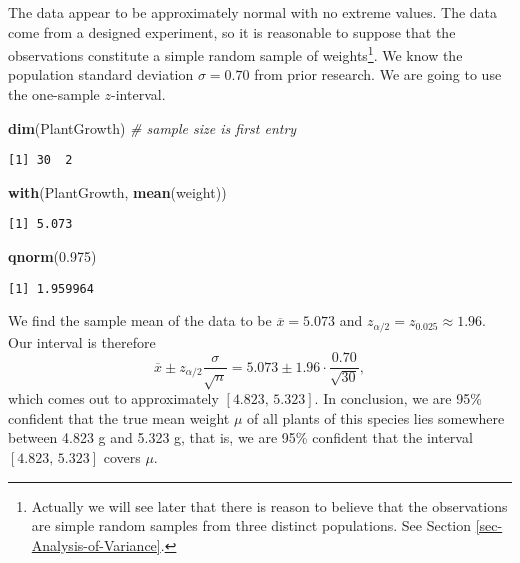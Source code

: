 \documentclass[]{book}
\newenvironment{Shaded}{\begin{snugshade}}{\end{snugshade}}
\newcommand{\KeywordTok}[1]{\textcolor[rgb]{0.13,0.29,0.53}{\textbf{{#1}}}}
\newcommand{\FloatTok}[1]{\textcolor[rgb]{0.00,0.00,0.81}{{#1}}}
\newcommand{\CommentTok}[1]{\textcolor[rgb]{0.56,0.35,0.01}{\textit{{#1}}}}
\newcommand{\NormalTok}[1]{{#1}}
\let\rmarkdownfootnote\footnote%
\def\footnote{\protect\rmarkdownfootnote}
\numberwithin{equation}{chapter}
\numberwithin{figure}{chapter}
\theoremstyle{plain}
\theoremstyle{definition}
\theoremstyle{remark}
\theoremstyle{definition}
\theoremstyle{definition}
\theoremstyle{remark}
\begin{document}
The data appear to be approximately normal with no extreme values. The
data come from a designed experiment, so it is reasonable to suppose
that the observations constitute a simple random sample of
weights\footnote{Actually we will see later that there is reason to
  believe that the observations are simple random samples from three
  distinct populations. See Section \ref{sec-Analysis-of-Variance}.}. We
know the population standard deviation \(\sigma=0.70\) from prior
research. We are going to use the one-sample \(z\)-interval.

\begin{Shaded}
\begin{Highlighting}[]
\KeywordTok{dim}\NormalTok{(PlantGrowth)   }\CommentTok{# sample size is first entry}
\end{Highlighting}
\end{Shaded}

\begin{verbatim}
[1] 30  2
\end{verbatim}

\begin{Shaded}
\begin{Highlighting}[]
\KeywordTok{with}\NormalTok{(PlantGrowth, }\KeywordTok{mean}\NormalTok{(weight))}
\end{Highlighting}
\end{Shaded}

\begin{verbatim}
[1] 5.073
\end{verbatim}

\begin{Shaded}
\begin{Highlighting}[]
\KeywordTok{qnorm}\NormalTok{(}\FloatTok{0.975}\NormalTok{)}
\end{Highlighting}
\end{Shaded}

\begin{verbatim}
[1] 1.959964
\end{verbatim}

We find the sample mean of the data to be \(\overline{x}=5.073\) and
\(z_{\alpha/2}=z_{0.025}\approx1.96\). Our interval is therefore \[
\overline{x}\pm
z_{\alpha/2}\frac{\sigma}{\sqrt{n}}=5.073\pm1.96\cdot\frac{0.70}{\sqrt{30}},
\] which comes out to approximately \([4.823,\,5.323]\). In conclusion,
we are 95\% confident that the true mean weight \(\mu\) of all plants of
this species lies somewhere between 4.823 g and 5.323 g, that is, we are
95\% confident that the interval \([4.823,\,5.323]\) covers \(\mu\).
\end{document}
